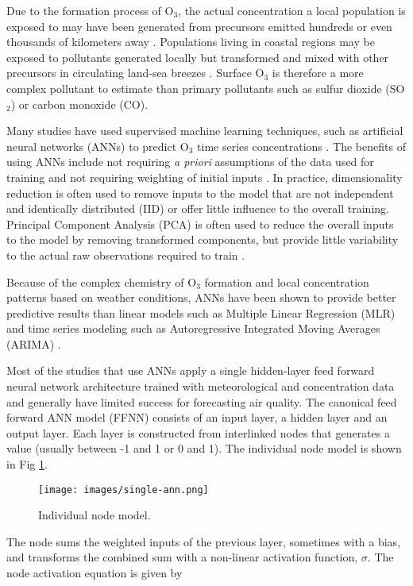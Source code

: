 \documentclass[preprint,12pt,a4paper,authoryear]{elsarticle}
\begin{document}
\begin{linenumbers}
Due to the formation process of O$_{3}$, the actual concentration a local population is exposed to may have been generated from precursors emitted hundreds or even thousands of kilometers away \citep{Glavas2011}. Populations living in coastal regions may be exposed to pollutants generated locally but transformed and mixed with other precursors in circulating land-sea breezes \citep{Freeman2016a}. Surface O$_{3}$ is therefore a more complex pollutant to estimate than primary pollutants such as sulfur dioxide (SO$_{2}$) or carbon monoxide (CO).

Many studies have used supervised machine learning techniques, such as artificial neural networks (ANNs) to predict O$_{3}$ time series concentrations \citep{Comrie1997, Dorling2003, Ettouney2009a, Kurt2008, Biancofiore2017}. The benefits of using ANNs include not requiring \textit{a priori} assumptions of the data used for training and not requiring weighting of initial inputs \citep{Gardner1998}. In practice, dimensionality reduction is often used to remove inputs to the model that are not independent and identically distributed (IID) or offer little influence to the overall training. Principal Component Analysis (PCA) is often used to reduce the overall inputs to the model by removing transformed components, but provide little variability to the actual raw observations required to train \citep{Singh2013, Wang2015a}.

Because of the complex chemistry of O$_{3}$ formation and local concentration patterns based on weather conditions, ANNs have been shown to provide better predictive results than linear models such as Multiple Linear Regression (MLR) and time series modeling such as Autoregressive Integrated Moving Averages (ARIMA) \citep{Gardner1998, Prybutok2000}. 

Most of the studies that use ANNs apply a single hidden-layer feed forward neural network architecture trained with meteorological and concentration data and generally have limited success for forecasting air quality. The canonical feed forward ANN model (FFNN) consists of an input layer, a hidden layer and an output layer. Each layer is constructed from interlinked nodes that generates a value (usually between -1 and 1 or 0 and 1). The individual node model is shown in Fig \ref{fig:SingleANN}. \\
%
\begin{figure}[H]
\centering
\texttt{[image: images/single-ann.png]} 
\caption{Individual node model.}
\label{fig:SingleANN}
\end{figure}
%
The node sums the weighted inputs of the previous layer, sometimes with a bias, and transforms the combined sum with a non-linear activation function, $\sigma$. The node activation equation is given by


\end{linenumbers}
\end{document}
